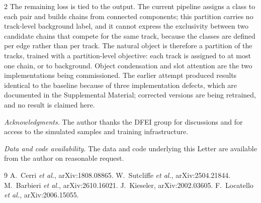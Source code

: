 \documentclass[10pt]{article}
\begin{document}
\begin{multicols}{2}
The remaining loss is tied to the output. The current pipeline assigns a class to each pair and builds chains from connected components; this partition carries no track-level background label, and it cannot express the exclusivity between two candidate chains that compete for the same track, because the classes are defined per edge rather than per track. The natural object is therefore a partition of the tracks, trained with a partition-level objective: each track is assigned to at most one chain, or to background. Object condensation \cite{oc} and slot attention \cite{slot} are the two implementations being commissioned. The earlier attempt produced results identical to the baseline because of three implementation defects, which are documented in the Supplemental Material; corrected versions are being retrained, and no result is claimed here.

\vspace{0.4em}
\noindent\emph{Acknowledgments.} The author thanks the DFEI group for discussions and for access to the simulated samples and training infrastructure.

\vspace{0.3em}
\noindent\emph{Data and code availability.} The data and code underlying this Letter are available from the author on reasonable request.

\begin{thebibliography}{9}
\footnotesize
{} A.~Cerri \textit{et al.}, arXiv:1808.08865.
 W.~Sutcliffe \textit{et al.}, arXiv:2504.21844.
 M.~Barbieri \textit{et al.}, arXiv:2610.16021.
 J.~Kieseler, arXiv:2002.03605.
 F.~Locatello \textit{et al.}, arXiv:2006.15055.
\end{thebibliography}

\end{multicols}
\end{document}
